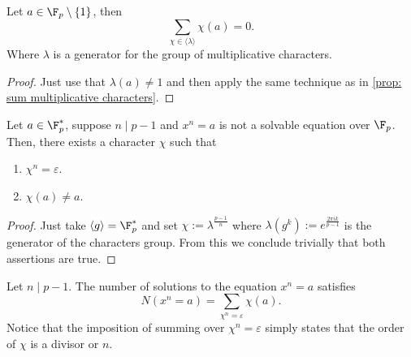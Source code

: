 \begin{proposition}
    Let \(a \in \F_p \setminus \{1\} \), then
    \[
        \sum_{\chi \in \langle \lambda \rangle} \chi(a) = 0.
    \]
    Where \(\lambda\) is a generator for the group of multiplicative characters.
\end{proposition}

\begin{proof}
    Just use that \(\lambda(a) \neq 1\) and then apply the same technique as in
    \ref{prop: sum multiplicative characters}.
\end{proof}

\begin{proposition}
    Let \(a \in \F_p^\ast\), suppose \(n \mid p-1\) and \(x^n = a\) is not a
    solvable equation over \(\F_p\). Then, there exists a character \(\chi\)
    such that
    \begin{enumerate}
        \item \(\chi^n = \varepsilon\).
        \item \(\chi(a) \neq  a\).
    \end{enumerate}
\end{proposition}

\begin{proof}
    Just take \(\langle g \rangle = \F_p^\ast\) and set \(\chi :=
    \lambda^{\frac{p-1}{n}}\) where \(\lambda(g^k) := e^{\frac{2 \pi i k}{p-1}}\)
    is the generator of the characters group. From this we conclude trivially
    that both assertions are true.
\end{proof}

\begin{proposition}
    Let \(n \mid p-1\). The number of solutions to the equation \(x^n = a\)
    satisfies
    \[
        N(x^n=a) = \sum_{\chi^n = \varepsilon} \chi(a).
    \]
    Notice that the imposition of summing over \(\chi^n = \varepsilon\) simply
    states that the order of \(\chi\) is a divisor or \(n\).
\end{proposition}

